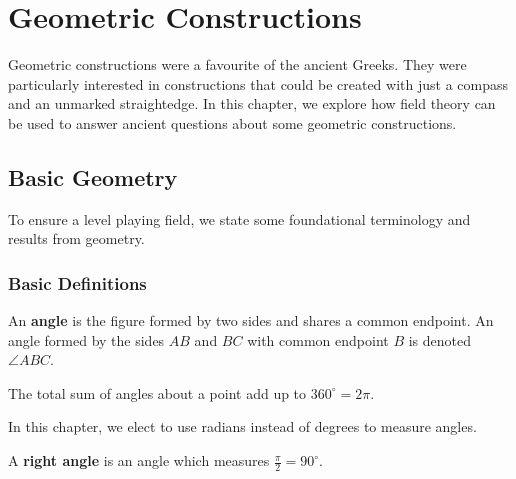 \newcommand{\constructionproof}[6][0.7\textwidth]{
    \vspace{0.1cm}
    \begin{proof}[Construction]
        \renewcommand{\qedsymbol}{}
        \renewcommand\windowpagestuff{#3}
        \opencutright
        \begin{cutout}{0}{#1}{0pt}{#2}
                #4
        \end{cutout}
    \end{proof}
    \textbf{Claim}. {#5}
    \begin{proof}
        #6
    \end{proof}
}

\chapter{Geometric Constructions}
Geometric constructions were a favourite of the ancient Greeks. They were particularly interested in constructions that could be created with just a compass and an unmarked straightedge. In this chapter, we explore how field theory can be used to answer ancient questions about some geometric constructions.

\section{Basic Geometry}
To ensure a level playing field, we state some foundational terminology and results from geometry.

\subsection{Basic Definitions}
\begin{definition}
    An \textbf{angle} is the figure formed by two sides and shares a common endpoint. An angle formed by the sides $AB$ and $BC$ with common endpoint $B$ is denoted $\angle ABC$.
\end{definition}

\begin{definition}
    The total sum of angles about a point add up to $360^\circ = 2\pi$.
\end{definition}

In this chapter, we elect to use radians instead of degrees to measure angles.

\begin{definition}
    A \textbf{right angle} is an angle which measures $\frac\pi2 = 90^\circ$.
\end{definition}

